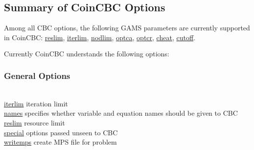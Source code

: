 \subsection{Summary of CoinCBC Options}

Among all CBC options, the following GAMS parameters are currently supported in CoinCBC:
\hyperlink{reslim}{reslim}, \hyperlink{iterlim}{iterlim}, \hyperlink{nodlim}{nodlim}, \hyperlink{optca}{optca}, \hyperlink{optcr}{optcr}, \hyperlink{increment}{cheat}, \hyperlink{cutoff}{cutoff}.

Currently CoinCBC understands the following options:

\subsubsection{General Options}
\begin{tabbing}
\hspace {1.3in} \= \\
\hyperlink{iterlim}
{iterlim} \> iteration limit \\
\hyperlink{names}
{names} \> specifies whether variable and equation names should be given to CBC \\
\hyperlink{reslim}
{reslim} \> resource limit \\
\hyperlink{special}
{special} \> options passed unseen to CBC \\
\hyperlink{writemps}
{writemps} \> create MPS file for problem \\
\end{tabbing}

